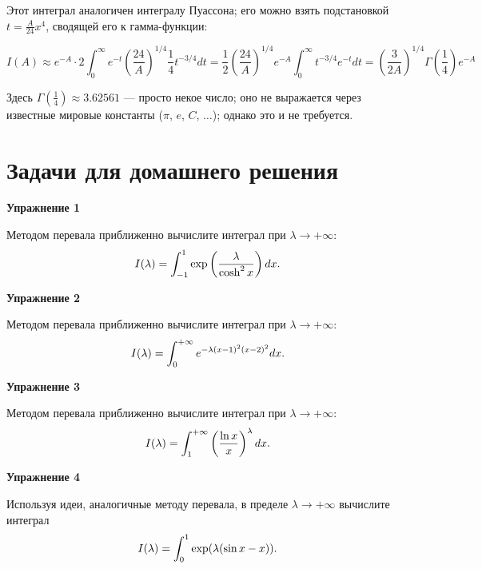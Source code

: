 \documentclass[a4paper,12pt]{article}
\begin{document}
\noindent
Этот интеграл аналогичен интегралу Пуассона; его можно взять подстановкой
$t=\frac{A}{24}x^{4}$, сводящей его к гамма-функции:

\[
I(A)\approx e^{-A}\cdot2\int_{0}^{\infty}e^{-t}\left(\frac{24}{A}\right)^{1/4}\frac{1}{4}t^{-3/4}dt=\frac{1}{2}\left(\frac{24}{A}\right)^{1/4}e^{-A}\int_{0}^{\infty}t^{-3/4}e^{-t}dt=\left(\frac{3}{2A}\right)^{1/4}\Gamma\left(\frac{1}{4}\right)e^{-A}
\]

\noindent
Здесь $\Gamma\left(\frac{1}{4}\right)\approx3.62561$ --- просто некое
число; оно не выражается через известные мировые константы ($\pi$,
$e$, $C$, $\dots$); однако это и не требуется.

\section{Задачи для домашнего решения}

\noindent \textbf{Упражнение 1}

\noindent Методом перевала приближенно вычислите интеграл при $\lambda\rightarrow+\infty$:
\begin{equation}
I(\lambda)=\int_{-1}^{1}\exp\left(\frac{\lambda}{\cosh^{2}x}\right)dx\text{.}	
\notag
\end{equation}

\vspace{15pt}
\noindent \textbf{Упражнение 2}

\noindent Методом перевала приближенно вычислите интеграл при $\lambda\rightarrow+\infty$:
\begin{equation}\notag
I(\lambda)	=\int_{0}^{+\infty}e^{-\lambda(x-1)^{2}(x-2)^{2}}dx.
\end{equation}

\vspace{15pt}
\noindent \textbf{Упражнение 3}

\noindent Методом перевала приближенно вычислите интеграл при $\lambda\rightarrow+\infty$:
\begin{equation}\notag
I(\lambda)=\int_{1}^{+\infty}\left(\frac{\ln x}{x}\right)^{\lambda}dx.	
\end{equation}

\vspace{15pt}
\noindent \textbf{Упражнение 4}

\noindent Используя идеи, аналогичные методу перевала, в пределе $\lambda\rightarrow+\infty$ вычислите интеграл
\begin{equation}\notag
I(\lambda)	=\int_{0}^{1}\exp(\lambda(\sin x-x)).
\end{equation}
\end{document}
